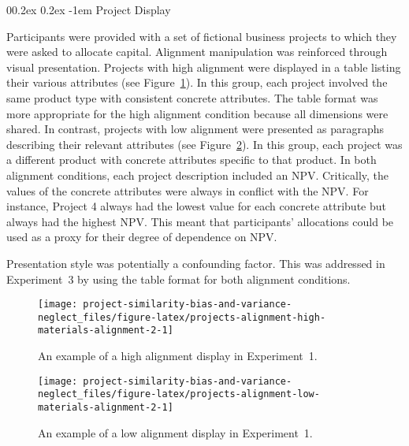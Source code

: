 \documentclass[
  english,
  man, donotrepeattitle,floatsintext]{apa7}
\makeatletter
\let\oldparagraph\paragraph
\renewcommand{\paragraph}[1]{\oldparagraph{#1}\mbox{}}
\renewcommand{\paragraph}{\@startsection{paragraph}{4}{\parindent}%
  {0\baselineskip \@plus 0.2ex \@minus 0.2ex}%
  {-1em}%
  {\normalfont\normalsize\bfseries\itshape\typesectitle}}
\theoremstyle{definition}
\theoremstyle{definition}
\theoremstyle{definition}
\theoremstyle{definition}
\theoremstyle{remark}
\makeatother
\begin{document}
\hypertarget{projects-materials-alignment-2}{%
\paragraph{Project Display}\label{projects-materials-alignment-2}}

Participants were provided with a set of fictional business projects to which
they were asked to allocate capital. Alignment manipulation was reinforced
through visual presentation. Projects with high alignment were displayed in a
table listing their various attributes (see
Figure~\ref{fig:projects-alignment-high-materials-alignment-2}). In this group,
each project involved the same product type with consistent concrete attributes.
The table format was more appropriate for the high alignment condition because
all dimensions were shared. In contrast, projects with low alignment were
presented as paragraphs describing their relevant attributes (see
Figure~\ref{fig:projects-alignment-low-materials-alignment-2}). In this group,
each project was a different product with concrete attributes specific to that
product. In both alignment conditions, each project description included an NPV.
Critically, the values of the concrete attributes were always in conflict with
the NPV. For instance, Project 4 always had the lowest value for each concrete
attribute but always had the highest NPV. This meant that participants'
allocations could be used as a proxy for their degree of dependence on NPV.

Presentation style was potentially a confounding factor. This was addressed in
Experiment~3 by using the table format for both alignment conditions.



\begin{figure}
\texttt{[image: project-similarity-bias-and-variance-neglect\_files/figure-latex/projects-alignment-high-materials-alignment-2-1]} \caption{An example of a high alignment display in Experiment~1.}\label{fig:projects-alignment-high-materials-alignment-2}
\end{figure}



\begin{figure}
\texttt{[image: project-similarity-bias-and-variance-neglect\_files/figure-latex/projects-alignment-low-materials-alignment-2-1]} \caption{An example of a low alignment display in Experiment~1.}\label{fig:projects-alignment-low-materials-alignment-2}
\end{figure}
\end{document}
